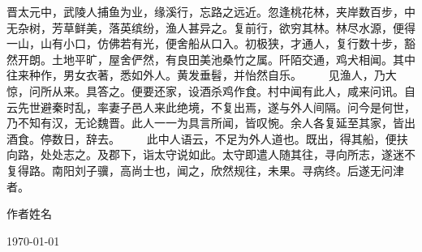 
晋太元中，武陵人捕鱼为业，缘溪行，忘路之远近。忽逢桃花林，夹岸数百步，中无杂树，芳草鲜美，落英缤纷，渔人甚异之。复前行，欲穷其林。林尽水源，便得一山，山有小口，仿佛若有光，便舍船从口入。初极狭，才通人，复行数十步，豁然开朗。土地平旷，屋舍俨然，有良田美池桑竹之属。阡陌交通，鸡犬相闻。其中往来种作，男女衣著，悉如外人。黄发垂髫，并怡然自乐。
　　见渔人，乃大惊，问所从来。具答之。便要还家，设酒杀鸡作食。村中闻有此人，咸来问讯。自云先世避秦时乱，率妻子邑人来此绝境，不复出焉，遂与外人间隔。问今是何世，乃不知有汉，无论魏晋。此人一一为具言所闻，皆叹惋。余人各复延至其家，皆出酒食。停数日，辞去。
　　此中人语云，不足为外人道也。既出，得其船，便扶向路，处处志之。及郡下，诣太守说如此。太守即遣人随其往，寻向所志，遂迷不复得路。南阳刘子骥，高尚士也，闻之，欣然规往，未果。寻病终。后遂无问津者。

\vspace{9pt}%
\begin{minipage}[t]{0.8\columnwidth}%
\begin{flushright}
作者姓名
\par\end{flushright}

\begin{flushright}
\today
\par\end{flushright}%
\end{minipage}
